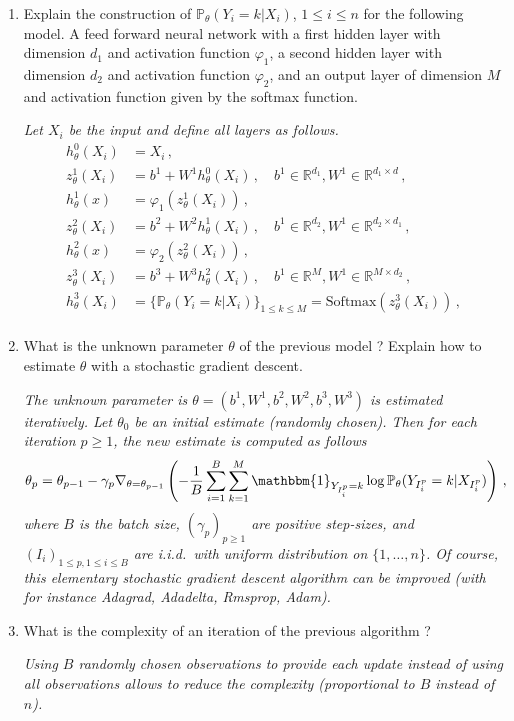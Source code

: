 \documentclass[a4paper,10pt,fleqn]{article}
\newcommand{\eqsp}{\,}
\newcommand{\1}{\ensuremath{\mathbbm{1}}}
\begin{document}
\begin{enumerate}
\item Explain the construction of $\mathbb{P}_{\theta}(Y_i = k | X_i)$, $1\leqslant i\leqslant n$ for the following model. A feed forward neural network with a first hidden layer with dimension $d_1$ and activation function $\varphi_1$,  a second hidden layer with dimension $d_2$ and activation function $\varphi_2$, and an output layer of dimension $M$ and activation function given by the softmax function.

\vspace{.2cm}

{\em
Let $X_i$ be the input and define all layers as follows.
\begin{align*}
h_{\theta}^0(X_i) &= X_i\eqsp,\\
z_{\theta}^1(X_i)  &= b^1 + W^1h_{\theta}^{0}(X_i)\eqsp, \quad b^1\in\mathbb{R}^{d_1}, W^1 \in\mathbb{R}^{d_1\times d}\eqsp,\\
h_{\theta}^1(x)  &= \varphi_1(z_{\theta}^{1}(X_i))\eqsp,\\
z_{\theta}^2(X_i)  &= b^2 + W^2h_{\theta}^{1}(X_i)\eqsp,\quad b^1\in\mathbb{R}^{d_2}, W^1 \in\mathbb{R}^{d_2\times d_1}\eqsp,\\
h_{\theta}^2(x)  &= \varphi_2(z_{\theta}^{2}(X_i))\eqsp,\\
z_{\theta}^3(X_i)  &= b^3 + W^3h_{\theta}^{2}(X_i)\eqsp,\quad b^1\in\mathbb{R}^{M}, W^1 \in\mathbb{R}^{M\times d_2}\eqsp,\\
h_{\theta}^3(X_i)  &= \{\mathbb{P}_{\theta}(Y_i = k | X_i)\}_{1\leq k \leq M} = \mathrm{Softmax}(z_{\theta}^{3}(X_i))\eqsp,\\
\end{align*}
}
\item What is the unknown parameter $\theta$ of the previous model ? Explain how to estimate $\theta$ with  a stochastic gradient descent.

\vspace{.2cm}

{\em
The unknown parameter is $\theta = (b^1,W^1,b^2,W^2,b^3,W^3)$ is estimated iteratively. Let $\theta_0$ be an initial estimate (randomly chosen). Then for each iteration $p\geqslant 1$, the new estimate is computed as follows
$$
\theta_p = \theta_{p-1} - \gamma_p \nabla_{\theta=\theta_{p-1}} \left(-\frac{1}{B} \sum_{i=1}^B\sum_{k=1}^{M} \1_{Y_{I_i^p}=k}\log \mathbb{P}_{\theta}(Y_{I_i^p} = k | X_{I_i^p})\right)\eqsp,
$$
where $B$ is the batch size, $(\gamma_p)_{p\geqslant 1}$ are positive step-sizes, and $(I_i)_{1 \leqslant p, 1 \leqslant i \leqslant B}$ are i.i.d.\ with uniform distribution on  $\{1,\ldots,n\}$. Of course, this elementary stochastic gradient descent algorithm can be improved (with for instance Adagrad, Adadelta, Rmsprop, Adam).
}
\item What is the complexity of an iteration of the previous algorithm ?

\vspace{.2cm}

{\em
Using $B$ randomly chosen observations to provide each update instead of using all observations allows to reduce the complexity (proportional to $B$ instead of $n$).
}
\end{enumerate}
\end{document}
